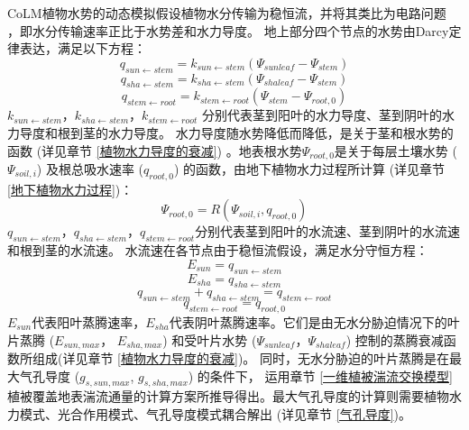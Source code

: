 CoLM植物水势的动态模拟假设植物水分传输为稳恒流，并将其类比为电路问题 
\citep{van1948water}，即水分传输速率正比于水势差和水力导度。
地上部分四个节点的水势由Darcy定律表达，满足以下方程：
\begin{equation}\label{q_sunstem}
q_{ {sun \leftarrow stem }}=k_{{sun} \leftarrow  {stem}}\left(\Psi_{sunleaf}-\Psi_{stem}\right)
\end{equation}
\begin{equation}
q_{ {sha \leftarrow stem }}=k_{ {sha} \leftarrow {stem}}\left(\Psi_{shaleaf}-\Psi_{ {stem }}\right)
\end{equation}
\begin{equation}
q_{ {stem \leftarrow root }}=k_{ {stem } \leftarrow  { root }}\left(\Psi_{ {stem }}-\Psi_{ {root }, 0}\right)
\end{equation}
$k_{sun \leftarrow stem}$，$k_{sha \leftarrow stem }$，$k_{stem \leftarrow root }$ 分别代表茎到阳叶的水力导度、茎到阴叶的水力导度和根到茎的水力导度。
水力导度随水势降低而降低，是关于茎和根水势的函数 (详见章节 \ref{植物水力导度的衰减}) 。地表根水势$\Psi_{root,0}$是关于每层土壤水势 ($\Psi_{soil,i}$) 
及根总吸水速率 ($q_{root,0}$) 的函数，由地下植物水力过程所计算 (详见章节 \ref{地下植物水力过程})：
\begin{equation}\label{Psi_root_0}
\Psi_{root, 0}=R\left(\Psi_{ {soil }, i}, q_{root, 0}\right)
\end{equation}
$q_{sun \leftarrow stem}$，$q_{sha \leftarrow stem }$，$q_{stem \leftarrow root }$分别代表茎到阳叶的水流速、茎到阴叶的水流速和根到茎的水流速。
水流速在各节点由于稳恒流假设，满足水分守恒方程：
\begin{equation}
E_{sun}=q_{sun \leftarrow  stem}
\end{equation}
\begin{equation}
E_{ {sha }}=q_{ sha \leftarrow stem}
\end{equation}
\begin{equation}
q_{ {sun \leftarrow stem }}+q_{ {sha \leftarrow stem }}=q_{ {stem \leftarrow root }}
\end{equation}
\begin{equation}\label{q_stemroot}
q_{stem \leftarrow root}=q_{root, 0}
\end{equation}
$E_{sun}$代表阳叶蒸腾速率，$E_{sha}$代表阴叶蒸腾速率。它们是由无水分胁迫情况下的叶片蒸腾 ($E_{sun,max}$， $E_{sha,max}$) 
和受叶片水势 ($\Psi_{sunleaf}$，$\Psi_{shaleaf}$) 控制的蒸腾衰减函数所组成(详见章节 \ref{植物水力导度的衰减})。
同时，无水分胁迫的叶片蒸腾是在最大气孔导度 ($g_{s,sun,max}$, $g_{s,sha,max}$) 的条件下，
运用章节 \ref{一维植被湍流交换模型} 植被覆盖地表湍流通量的计算方案所推导得出。最大气孔导度的计算则需要植物水力模式、光合作用模式、气孔导度模式耦合解出 (详见章节 \ref{气孔导度})。

